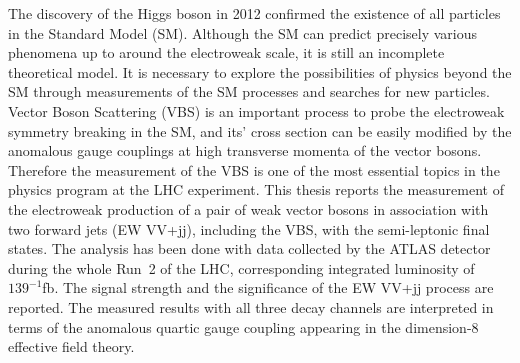 The discovery of the Higgs boson in 2012 confirmed the existence of all particles in the Standard Model (SM). 
Although the SM can predict precisely various phenomena up to around the electroweak scale, it is still an incomplete theoretical model. 
It is necessary to explore the possibilities of physics beyond the SM through measurements of the SM processes and searches for new particles. 
Vector Boson Scattering (VBS) is an important process to probe the electroweak symmetry breaking in the SM, and its’ cross section can be easily modified by the anomalous gauge couplings at high transverse momenta of the vector bosons. 
Therefore the measurement of the VBS is one of the most essential topics in the physics program at the LHC experiment.
This thesis reports the measurement of the electroweak production of a pair of weak vector bosons in association with two forward jets (EW VV+jj), including the VBS, with the semi-leptonic final states.
The analysis has been done with data collected by the ATLAS detector during the whole Run~2 of the LHC, corresponding integrated luminosity of $139^{-1}$fb.
The signal strength and the significance of the EW VV+jj process are reported.
The measured results with all three decay channels are interpreted in terms of the anomalous quartic gauge coupling appearing in the dimension-8 effective field theory.

